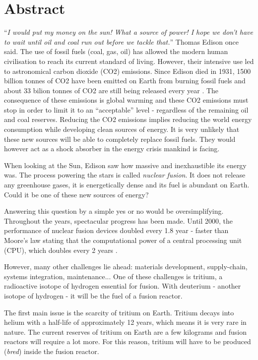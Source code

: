 \chapter*{Abstract}

``\textit{I would put my money on the sun! What a source of power! I hope we don't have to wait until oil and coal run out before we tackle that.}'' Thomas Edison once said.
The use of fossil fuels (coal, gas, oil) has allowed the modern human civilisation to reach its current standard of living.
However, their intensive use led to astronomical carbon dioxide (CO2) emissions.
Since Edison died in 1931, 1500 billion tonnes of CO2 have been emitted on Earth from burning fossil fuels and about 33 bilion tonnes of CO2 are still being released every year \cite{friedlingstein_global_2021}.
The consequence of these emissions is global warming and these CO2 emissions must stop in order to limit it to an ``acceptable'' level - regardless of the remaining oil and coal reserves.
Reducing the CO2 emissions implies reducing the world energy consumption while developing clean sources of energy.
It is very unlikely that these new sources will be able to completely replace fossil fuels.
They would however act as a shock absorber in the energy crisis mankind is facing.

When looking at the Sun, Edison saw how massive and inexhaustible its energy was.
The process powering the stars is called \textit{nuclear fusion}.
It does not release any greenhouse gases, it is energetically dense and its fuel is abundant on Earth.
Could it be one of these new sources of energy?

Answering this question by a simple yes or no would be oversimplifying.
Throughout the years, spectacular progress has been made.
Until 2000, the performance of nuclear fusion devices doubled every 1.8 year - faster than Moore's law stating that the computational power of a central processing unit (CPU), which doubles every 2 years \cite{webster_fusion_2003}.

However, many other challenges lie ahead: materials development, supply-chain, systems integration, maintenance...
One of these challenges is tritium, a radioactive isotope of hydrogen essential for fusion.
With deuterium - another isotope of hydrogen - it will be the fuel of a fusion reactor.

The first main issue is the scarcity of tritium on Earth.
Tritium decays into helium with a half-life of approximately 12 years, which means it is very rare in nature.
The current reserves of tritium on Earth are a few kilograms and fusion reactors will require a lot more.
For this reason, tritium will have to be produced (\textit{bred}) inside the fusion reactor.

